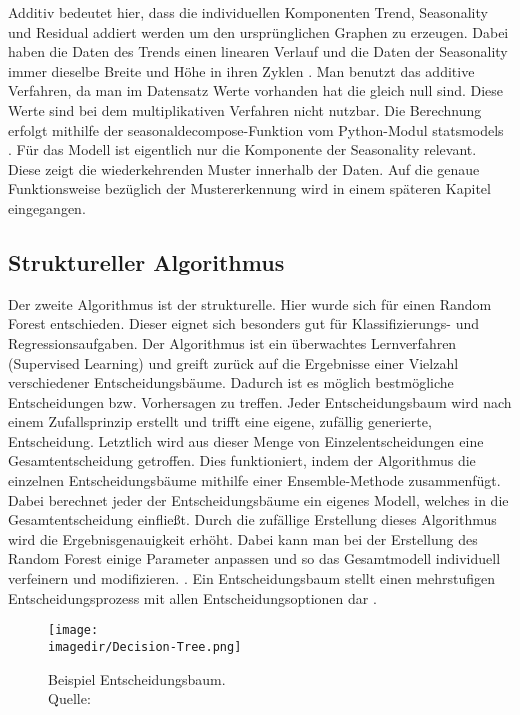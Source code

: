 Additiv bedeutet hier, dass die individuellen Komponenten Trend, Seasonality und Residual addiert werden um den ursprünglichen Graphen zu erzeugen. Dabei haben die Daten des Trends einen linearen Verlauf und die Daten der Seasonality immer dieselbe Breite und Höhe in ihren Zyklen . Man benutzt das additive Verfahren, da man im Datensatz Werte vorhanden hat die gleich null sind. Diese Werte sind bei dem multiplikativen Verfahren nicht nutzbar. Die Berechnung erfolgt mithilfe der seasonal\textunderscore decompose-Funktion vom Python-Modul statsmodels \autocite[Vgl.][]{Radecic.15.7.2021}. Für das Modell ist eigentlich nur die Komponente der Seasonality relevant. Diese zeigt die wiederkehrenden Muster innerhalb der Daten. Auf die genaue Funktionsweise bezüglich der Mustererkennung wird in einem späteren Kapitel eingegangen.



\subsection{Struktureller Algorithmus}

Der zweite Algorithmus ist der strukturelle. Hier wurde sich für einen Random Forest entschieden. Dieser eignet sich besonders gut für Klassifizierungs- und Regressionsaufgaben. Der Algorithmus ist ein überwachtes Lernverfahren (Supervised Learning) und greift zurück auf die Ergebnisse einer Vielzahl verschiedener Entscheidungsbäume. Dadurch ist es möglich bestmögliche Entscheidungen bzw. Vorhersagen zu treffen. Jeder Entscheidungsbaum wird nach einem Zufallsprinzip erstellt und trifft eine eigene, zufällig generierte, Entscheidung. Letztlich wird aus dieser Menge von Einzelentscheidungen eine Gesamtentscheidung getroffen. Dies funktioniert, indem der Algorithmus die einzelnen Entscheidungsbäume mithilfe einer Ensemble-Methode zusammenfügt. Dabei berechnet jeder der Entscheidungsbäume ein eigenes Modell, welches in die Gesamtentscheidung einfließt. Durch die zufällige Erstellung dieses Algorithmus wird die Ergebnisgenauigkeit erhöht. Dabei kann man bei der Erstellung des Random Forest einige Parameter anpassen und so das Gesamtmodell individuell verfeinern und modifizieren. \autocite[Vgl.][]{Luber.17.3.2020}. Ein Entscheidungsbaum stellt einen mehrstufigen Entscheidungsprozess mit allen Entscheidungsoptionen dar \autocite{t2informatik.WirentwickelnSoftware..06062018}.

\begin{figure}[H]

	\centering
	\texttt{[image: \\imagedir/Decision-Tree.png]}
	\captionsetup{format=hang}
	\caption[Beispiel Entscheidungsbaum]{\label{fig:test}Beispiel Entscheidungsbaum. \\Quelle:
		\cite{.06112021}}

\end{figure}

